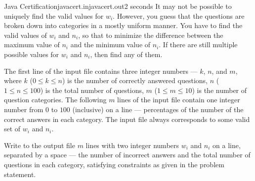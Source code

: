 \begin{problem}{Java Certification}{javacert.in}{javacert.out}{2 seconds}
It may not be possible to uniquely find the valid values for $w_i$. However, you
guess that the questions are broken down into categories in a mostly uniform manner. 
You have to find the valid values of $w_i$ and $n_i$, so that to minimize the difference 
between the maximum value of $n_i$ and the minimum value of $n_i$. If there are still 
multiple possible values for $w_i$ and $n_i$, then find any of them.

\InputFile

The first line of the input file contains three integer numbers --- $k$, $n$, and $m$,
where $k$ ($0 \le k \le n$) is the number of correctly answered questions, 
$n$ ($1 \le n \le 100$) is the total number of questions, $m$ ($1 \le m \le 10$) 
is the number of question categories. The following $m$ lines of the input file 
contain one integer number from $0$ to $100$ (inclusive) on a line --- 
percentages of the number of the correct answers in each category.
The input file always corresponds to some valid set of $w_i$ and $n_i$.

\OutputFile

Write to the output file $m$ lines with two integer numbers $w_i$ and $n_i$ on a line,
separated by a space --- the number of incorrect answers and the total number of questions
in each category, satisfying constraints as given in the problem statement. 

\Example

\begin{example}
%
\end{example}

\end{problem}
